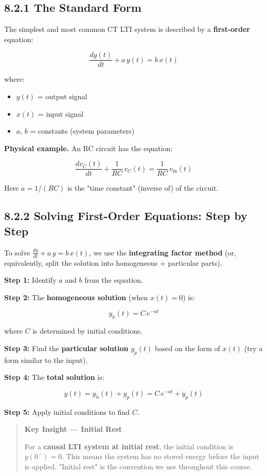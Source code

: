 \documentclass[11pt]{article}
\begin{document}
\subsection*{8.2.1 The Standard Form}

The simplest and most common CT LTI system is described by a \textbf{first-order} equation:

\[\boxed{\;\frac{dy(t)}{dt} + a\,y(t) = b\,x(t)\;}\]

where:

\begin{itemize}
  \item $y(t)$ = output signal
  \item $x(t)$ = input signal
  \item $a,\,b$ = constants (system parameters)
\end{itemize}

\textbf{Physical example.} An RC circuit has the equation:

\[\frac{d v_C(t)}{d t} + \frac{1}{RC}\,v_C(t) = \frac{1}{RC}\,v_{\text{in}}(t)\]

Here $a = 1/(RC)$ is the "time constant" (inverse of) of the circuit.

\subsection*{8.2.2 Solving First-Order Equations: Step by Step}

To solve $\tfrac{dy}{dt} + a\,y = b\,x(t)$, we use the \textbf{integrating factor method} (or, equivalently, split the solution into homogeneous + particular parts).

\textbf{Step 1:} Identify $a$ and $b$ from the equation.

\textbf{Step 2:} The \textbf{homogeneous solution} (when $x(t) = 0$) is:

\[y_h(t) = C\,e^{-at}\]

where $C$ is determined by initial conditions.

\textbf{Step 3:} Find the \textbf{particular solution} $y_p(t)$ based on the form of $x(t)$ (try a form similar to the input).

\textbf{Step 4:} The \textbf{total solution} is:

\[y(t) = y_h(t) + y_p(t) = C\,e^{-at} + y_p(t)\]

\textbf{Step 5:} Apply initial conditions to find $C$.

\begin{quote}
\textbf{Key Insight — Initial Rest}

For a \textbf{causal LTI system at initial rest}, the initial condition is $y(0^-) = 0$. This means the system has no stored energy before the input is applied. "Initial rest" is the convention we use throughout this course.
\end{quote}
\end{document}
